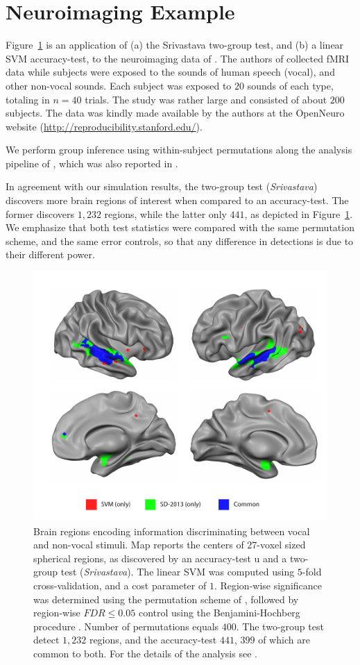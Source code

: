 \documentclass[]{bio}
\begin{document}
\section{Neuroimaging Example}
\label{sec:example}

Figure~\ref{fig:read_data} is an application of (a) the Srivastava two-group test, and (b) a linear SVM accuracy-test, to the neuroimaging data of \citet{pernet_human_2015}. 
The authors of \cite{pernet_human_2015} collected fMRI data while subjects were exposed to the sounds of human speech (vocal), and other non-vocal sounds. 
Each subject was exposed to $20$ sounds of each type, totaling in $n=40$ trials.
The study was rather large and consisted of about $200$ subjects.
The data was kindly made available by the authors at the OpenNeuro website (\url{http://reproducibility.stanford.edu/}).

We perform group inference using within-subject permutations along the analysis pipeline of \cite{stelzer_statistical_2013}, which was also reported in \cite{gilron_quantifying_2016}. 

In agreement with our simulation results, the two-group test (\emph{Srivastava}) discovers more brain regions of interest when compared to an accuracy-test.
The former discovers $1,232$ regions, while the latter only $441$, as depicted in Figure~\ref{fig:read_data}.
We emphasize that both test statistics were compared with the same permutation scheme, and the same error controls, so that any difference in detections is due to their different power.


\begin{figure}[th]
	\centering
	\includegraphics[width=0.5\columnwidth]{"art/svm_vs_SD"}
	\caption{\footnotesize
		Brain regions encoding information discriminating between vocal and non-vocal stimuli.
		Map reports the centers of $27$-voxel sized spherical regions, as discovered by an accuracy-test u and a two-group test (\emph{Srivastava}). 
		The linear SVM was computed using $5$-fold cross-validation, and a cost parameter of $1$. 
		Region-wise significance was determined using the permutation scheme of \cite{stelzer_statistical_2013}, followed by region-wise $FDR \leq 0.05$ control using the Benjamini-Hochberg procedure \cite{benjamini_controlling_1995}.
		Number of permutations equals $400$.
		The two-group test detect $1,232$ regions, and the accuracy-test $441$, $399$ of which are common to both.
		For the details of the analysis see \cite{gilron_quantifying_2016}.  
	}
	\label{fig:read_data}
\end{figure}
\end{document}
